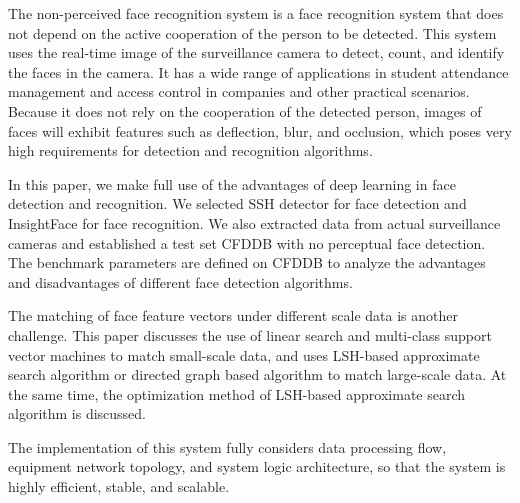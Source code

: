 \begin{englishabstract}

The non-perceived face recognition system is a face recognition system that does not depend on the active cooperation of the person to be detected. This system uses the real-time image of the surveillance camera to detect, count, and identify the faces in the camera. It has a wide range of applications in student attendance management and access control in companies and other practical scenarios. Because it does not rely on the cooperation of the detected person, images of faces will exhibit features such as deflection, blur, and occlusion, which poses very high requirements for detection and recognition algorithms.

In this paper, we make full use of the advantages of deep learning in face detection and recognition. We selected SSH detector \cite{najibi2017ssh} for face detection and InsightFace\cite{deng2018arcface} for face recognition. We also extracted data from actual surveillance cameras and established a test set CFDDB with no perceptual face detection. The benchmark parameters are defined on CFDDB to analyze the advantages and disadvantages of different face detection algorithms.

The matching of face feature vectors under different scale data is another challenge. This paper discusses the use of linear search and multi-class support vector machines to match small-scale data, and uses LSH-based approximate search algorithm or directed graph based algorithm to match large-scale data. At the same time, the optimization method of LSH-based approximate search algorithm is discussed.

The implementation of this system fully considers data processing flow, equipment network topology, and system logic architecture, so that the system is highly efficient, stable, and scalable.

\end{englishabstract}

